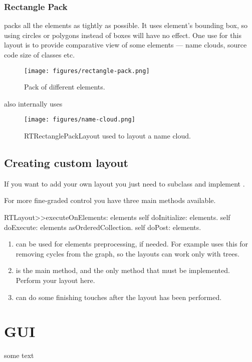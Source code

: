 \documentclass[a4paper,10pt,twoside]{book}
\begin{document}
\subsection{ Rectangle Pack}
 packs all the elements as tightly as possible. It uses element's bounding box, so using circles or polygons instead of boxes will have no effect. One use for this layout is to provide comparative view of some elements — name clouds, source code size of classes etc.


\begin{figure}

\begin{center}
\texttt{[image: figures/rectangle-pack.png]}\caption{Pack of different elements.\label{rectangle-pack}}\end{center}
\end{figure}


 also internally uses 


\begin{figure}

\begin{center}
\texttt{[image: figures/name-cloud.png]}\caption{ RTRectanglePackLayout used to layout a name cloud.\label{name-cloud}}\end{center}
\end{figure}

\section{ Creating custom layout}
If you want to add your own layout you just need to subclass  and implement .

For more fine-graded control you have three main methods available.


\begin{code}{}
RTLayout>>executeOnElements: elements
	self doInitialize: elements.
	self doExecute: elements asOrderedCollection.
	self doPost: elements.
\end{code}


\begin{enumerate}
\item  {} can be used for elements preprocessing, if needed. For example  uses this for removing cycles from the graph, so the layouts can work only with trees.
\item  {} is the main method, and the only method that must be implemented. Perform your layout here.
\item  {} can do some finishing touches after the layout has been performed.
\end{enumerate}
\chapter{GUI}
some text





\printindex
\end{document}
